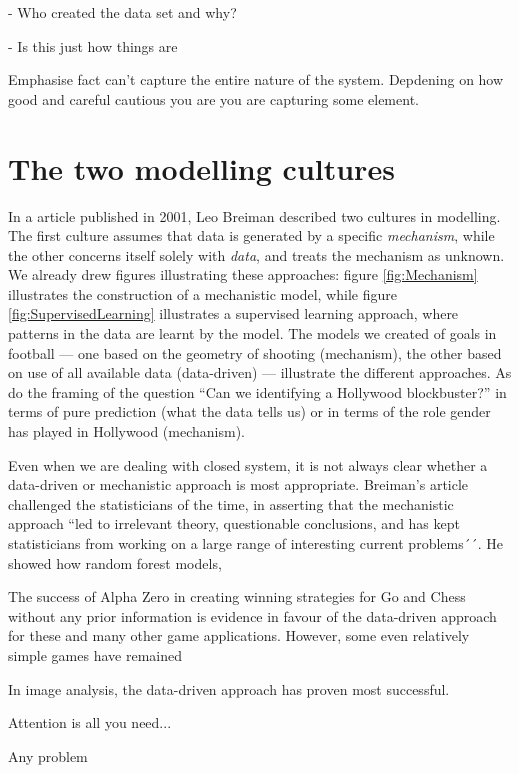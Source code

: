 - Who created the data set and why?

- Is this just how things are 

Emphasise fact can't capture the entire nature of the system. Depdening on how good and careful cautious you are you are capturing some element.

\section{The two modelling cultures}

\label{sec:twocultures}

In a article published in 2001, Leo Breiman described two cultures in modelling. The first culture assumes that data is generated by a specific {\it mechanism}, while the other concerns itself solely with {\it data}, and treats the mechanism as unknown. We already drew figures illustrating these approaches: figure \ref{fig:Mechanism} illustrates the construction of a mechanistic model, while figure \ref{fig:SupervisedLearning} illustrates a supervised learning approach, where patterns in the data are learnt by the model. The models we created of goals in football --- one based on the geometry of shooting (mechanism), the other based on use of all available data (data-driven) --- illustrate the different approaches. As do the framing of the question ``Can we identifying a Hollywood blockbuster?'' in terms of pure prediction (what the data tells us) or in terms of the role gender has played in Hollywood (mechanism).

Even when we are dealing with closed system, it is not always clear whether a data-driven or mechanistic approach is most appropriate. Breiman's article challenged the statisticians of the time, in asserting that the mechanistic approach ``led to irrelevant theory, questionable conclusions, and has kept statisticians from working on a large range of interesting current problems´´. He showed how random forest models, 

The success of Alpha Zero in creating winning strategies for Go and Chess without any prior information is evidence in favour of the data-driven approach for these and many other game applications. However, some even relatively simple games have remained 


In image analysis, the data-driven approach has proven most successful. 



Attention is all you need...


Any problem 


